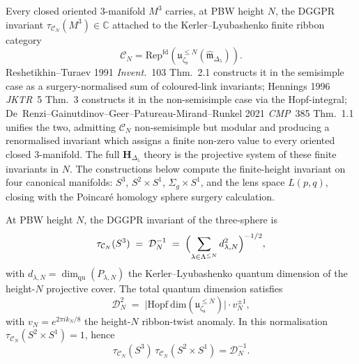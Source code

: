 Every closed oriented 3-manifold \(M^3\) carries, at PBW height \(N\),
the DGGPR invariant
\(\tau_{\mathcal C_N}(M^3) \in \mathbb C\) attached to the
Kerler--Lyubashenko finite ribbon category
\[
 \mathcal C_N =
 \mathrm{Rep}^{\mathrm{fd}}(\mathfrak u_{\zeta_8}^{\leq N}
 (\widehat{\mathfrak m}_{\Delta_5})).
\]
Reshetikhin--Turaev
1991 \emph{Invent.}~103 Thm.~2.1 constructs it in the semisimple
case as a surgery-normalised sum of coloured-link invariants;
Hennings 1996 \emph{JKTR}~5 Thm.~3 constructs it in the non-semisimple
case via the Hopf-integral; De~Renzi--Gainutdinov--Geer--Patureau-Mirand--Runkel
2021 \emph{CMP}~385 Thm.~1.1 unifies the two, admitting
\(\mathcal C_N\) non-semisimple but modular and producing a
renormalised invariant which assigns a finite non-zero value to every
oriented closed 3-manifold. The full \(\mathbf H_{\Delta_5}\) theory is
the projective system of these finite invariants in \(N\). The
constructions below compute the finite-height invariant
on four canonical manifolds: $S^3$, $S^2\times S^1$,
$\Sigma_g\times S^1$, and the lens space $L(p,q)$, closing with the
Poincar\'e homology sphere surgery calculation.

\begin{theorem}
\label{thm:modtr-rt-S3}
At PBW height \(N\), the DGGPR invariant of the three-sphere is
\[
 \tau_{\mathcal C_N}(S^3)
 \;=\;
 \mathcal D_N^{-1}
 \;=\;
 \Bigl(\sum_{\lambda\in\Lambda^{\leq N}} d_{\lambda,N}^2\Bigr)^{-1/2},
\]
with \(d_{\lambda,N} = \dim_{\mathrm{qu}}(P_{\lambda,N})\) the
Kerler--Lyubashenko quantum dimension of the height-\(N\) projective
cover. The total quantum dimension satisfies
\[
 \mathcal D_N^2
 \;=\;
 \bigl|\mathrm{Hopf\ dim}(\mathfrak u_{\zeta_8}^{\leq N})\bigr|
 \cdot v_N^{\pm 1},
\]
with \(v_N = e^{2\pi i k_N/8}\) the height-\(N\) ribbon-twist anomaly.
In this normalisation
\(\tau_{\mathcal C_N}(S^2\!\times\!S^1)=1\), hence
\[
 \tau_{\mathcal C_N}(S^3)\,
 \tau_{\mathcal C_N}(S^2\!\times\!S^1)
 =
 \mathcal D_N^{-1}.
\]
\end{theorem}

